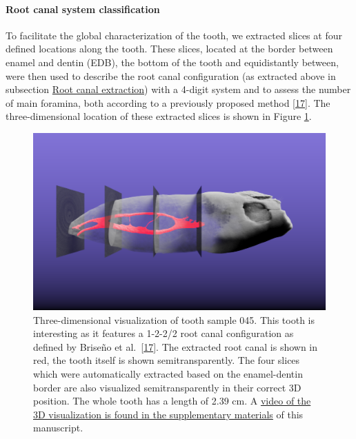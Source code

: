 \documentclass[
  american,
]{article}
\begin{document}
\hypertarget{root-canal-system-classification}{%
\paragraph{Root canal system classification}\label{root-canal-system-classification}}

To facilitate the global characterization of the tooth, we extracted slices at four defined locations along the tooth.
These slices, located at the border between enamel and dentin (EDB), the bottom of the tooth and equidistantly between, were then used to describe the root canal configuration (as extracted above in subsection \protect\hyperlink{root-canal-extraction}{Root canal extraction}) with a 4-digit system and to assess the number of main foramina, both according to a previously proposed method {[}\protect\hyperlink{ref-ZTgDEakx}{17}{]}.
The three-dimensional location of these extracted slices is shown in Figure \ref{fig:3dmevislab}.

\begin{figure}
\hypertarget{fig:3dmevislab}{%
\centering
\includegraphics{images/Tooth045.MeVisLab.png}
\caption{Three-dimensional visualization of tooth sample 045.
This tooth is interesting as it features a 1-2-2/2 root canal configuration as defined by Briseño et al.~{[}\protect\hyperlink{ref-ZTgDEakx}{17}{]}.
The extracted root canal is shown in red, the tooth itself is shown semitransparently.
The four slices which were automatically extracted based on the enamel-dentin border are also visualized semitransparently in their correct 3D position.
The whole tooth has a length of 2.39 cm.
A \href{https://github.com/habi/zmk-tooth-cohort-method-manuscript/blob/master/content/images/tooth045.mp4?raw=true}{video of the 3D visualization is found in the supplementary materials} of this manuscript.}\label{fig:3dmevislab}
}
\end{figure}
\end{document}
